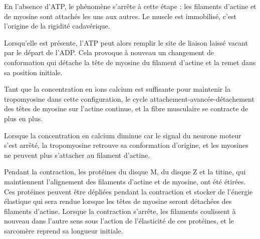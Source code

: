 En l'absence d'ATP, le phénomène s'arrête à cette étape : les filaments d'actine et de myosine sont attachés les uns aux autres. Le muscle est immobilisé, c'est l'origine de la rigidité cadavérique. 

Lorsqu'elle est présente, l'ATP peut alors remplir le site de liaison laissé vacant par le départ de l'ADP. Cela provoque à nouveau un changement de conformation qui détache la tête de myosine du filament d'actine et la remet dans sa position initiale.

Tant que la concentration en ions calcium est suffisante pour maintenir la tropomyosine dans cette configuration, le cycle attachement-avancée-détachement des têtes de myosine sur l'actine continue, et la fibre musculaire se contracte de plus en plus. 

Lorsque la concentration en calcium diminue car le signal du neurone moteur s'est arrêté, la tropomyosine retrouve sa conformation d'origine, et les myosines ne peuvent plus s'attacher au filament d'actine. 

Pendant la contraction, les protéines du disque M, du disque Z et la titine, qui maintiennent l'alignement des filaments d'actine et de myosine, ont été étirées. Ces protéines peuvent être dépliées pendant la contraction et stocker de l'énergie élastique qui sera rendue lorsque les têtes de myosine seront détachées des filaments d'actine. Lorsque la contraction s'arrête, les filaments coulissent à nouveau dans l'autre sens sous l'action de l'élasticité de ces protéines, et le sarcomère  reprend sa longueur initiale. 


